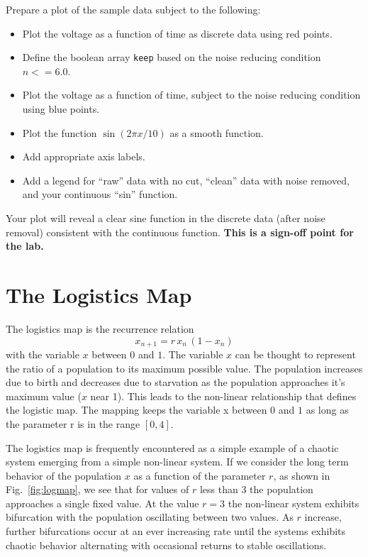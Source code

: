 \noindent
\begin{plot} \end{plot}
Prepare a plot of the sample data subject to the following:
\begin{itemize}
 \item Plot the voltage as a function of time as discrete data using red points.
 \item Define the boolean array {\tt keep} based on the noise reducing condition $n<=6.0$.
 \item Plot the voltage as a function of time, subject to the noise reducing condition using blue points.
 \item Plot the function $\sin(2 \pi x / 10)$ as a smooth function.
 \item Add appropriate axis labels.
 \item Add a legend for ``raw'' data with no cut, ``clean'' data with noise removed, and your continuous ``sin'' function.   
\end{itemize}
Your plot will reveal a clear sine function in the discrete data
(after noise removal) consistent with the continuous function.  {\bf
  This is a sign-off point for the lab.}

\section{The Logistics Map}
The logistics map is the recurrence relation
\begin{displaymath}
x_{n+1} = r \, x_n \, (1 - x_n)
\end{displaymath}
with the variable $x$ between $0$ and $1$.  The variable $x$ can be
thought to represent the ratio of a population to its maximum possible
value.  The population increases due to birth and decreases due to
starvation as the population approaches it's maximum value ($x$ near
1).  This leads to the non-linear relationship that defines the
logistic map.  The mapping keeps the variable x between $0$ and $1$ as
long as the parameter r is in the range $[0,4]$.

The logistics map is frequently encountered as a simple example of a
chaotic system emerging from a simple non-linear system.  If we
consider the long term behavior of the population $x$ as a function of
the parameter $r$, as shown in Fig.~\ref{fig:logmap}, we see that for
values of $r$ less than $3$ the population approaches a single fixed
value.  At the value $r=3$ the non-linear system exhibits bifurcation
with the population oscillating between two values.  As $r$ increase,
further bifurcations occur at an ever increasing rate until the
systems exhibits chaotic behavior alternating with occasional returns
to stable oscillations.

